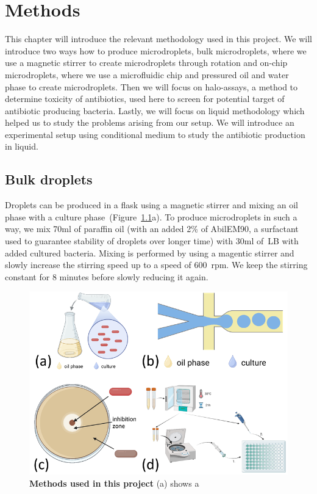 \chapter{Methods}

This chapter will introduce the relevant methodology used in this project. We will introduce two ways how to produce microdroplets, bulk microdroplets, where we use a magnetic stirrer to create microdroplets through rotation and on-chip microdroplets, where we use a microfluidic chip and pressured oil and water phase to create microdroplets. Then we will focus on halo-assays, a method to determine toxicity of antibiotics, used here to screen for potential target of antibiotic producing bacteria. Lastly, we will focus on liquid methodology which helped us to study the problems arising from our setup. We will introduce an experimental setup using conditional medium to study the antibiotic production in liquid.

\section{Bulk droplets}
Droplets can be produced in a flask using a magnetic stirrer and mixing an oil phase with a culture phase~(Figure~\ref{fig:method_droplet_experiments}a). To produce microdroplets in such a way, we mix 70ml of paraffin oil (with an added 2\% of AbilEM90, a surfactant used to guarantee stability of droplets over longer time) with 30ml of~\gls{LB} with added cultured bacteria. Mixing is performed by using a magentic stirrer and slowly increase the stirring speed up to a speed of 600~\gls{rpm}. We keep the stirring constant for 8 minutes before slowly reducing it again. 

\begin{figure}
\centering
\includegraphics[width=\linewidth]{graphics/2025_09_28_droplets_fig2.png}
\caption{\textbf{Methods used in this project} (a) shows a}
\label{fig:method_droplet_experiments}
\end{figure}

